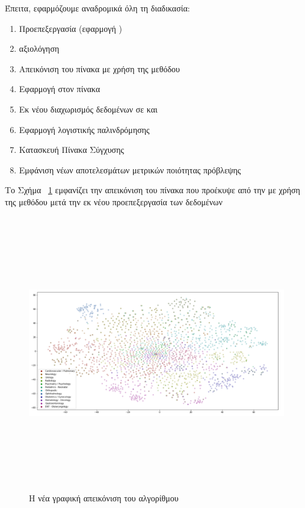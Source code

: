 Έπειτα, εφαρμόζουμε αναδρομικά όλη τη διαδικασία:
\begin{enumerate}
    \item Προεπεξεργασία (εφαρμογή )
    \item {} αξιολόγηση
    \item Απεικόνιση του πίνακα  με χρήση της μεθόδου 
    \item Εφαρμογή  στον πίνακα 
    \item Εκ νέου διαχωρισμός δεδομένων σε  και 
    \item Εφαρμογή λογιστικής παλινδρόμησης 
    \item Κατασκευή Πίνακα Σύγχυσης 
    \item Εμφάνιση νέων αποτελεσμάτων μετρικών ποιότητας πρόβλεψης
\end{enumerate}

Το Σχήμα~ \ref{figure5.6} εμφανίζει την απεικόνιση του πίνακα που προέκυψε από την  με χρήση της μεθόδου  μετά την εκ νέου προεπεξεργασία των δεδομένων 

\begin{figure} [ht!]
\centering
\includegraphics[width=\textwidth,height=12cm,keepaspectratio]{pictures/5.6tsne2.png} 
\caption{Η νέα γραφική απεικόνιση του αλγορίθμου }\label{figure5.6}
\end{figure}


